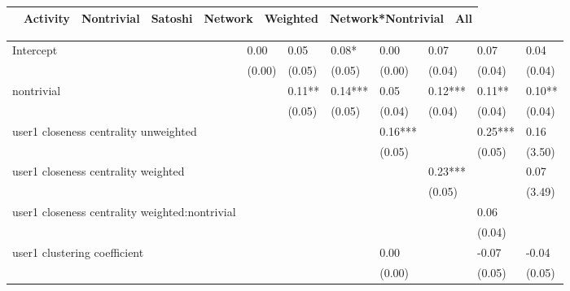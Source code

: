 \begin{table*}
\caption{Volume OR}
\begin{center}
\begin{tabular}{lccccccc}
\hline
                                               & Activity & Nontrivial & Satoshi & Network & Weighted & Network*Nontrivial &  All    \\
\hline
\hline
\end{tabular}
\begin{tabular}{llllllll}
Intercept                                      & 0.00     & 0.05       & 0.08*   & 0.00    & 0.07     & 0.07               & 0.04    \\
                                               & (0.00)   & (0.05)     & (0.05)  & (0.00)  & (0.04)   & (0.04)             & (0.04)  \\
nontrivial                                     &          & 0.11**     & 0.14*** & 0.05    & 0.12***  & 0.11**             & 0.10**  \\
                                               &          & (0.05)     & (0.05)  & (0.04)  & (0.04)   & (0.04)             & (0.04)  \\
user1 closeness centrality unweighted          &          &            &         & 0.16*** &          & 0.25***            & 0.16    \\
                                               &          &            &         & (0.05)  &          & (0.05)             & (3.50)  \\
user1 closeness centrality weighted            &          &            &         &         & 0.23***  &                    & 0.07    \\
                                               &          &            &         &         & (0.05)   &                    & (3.49)  \\
user1 closeness centrality weighted:nontrivial &          &            &         &         &          & 0.06               &         \\
                                               &          &            &         &         &          & (0.04)             &         \\
user1 clustering coefficient                   &          &            &         & 0.00    &          & -0.07              & -0.04   \\
                                               &          &            &         & (0.00)  &          & (0.05)             & (0.05)  \\

\end{tabular}
\end{center}
\end{table*}
